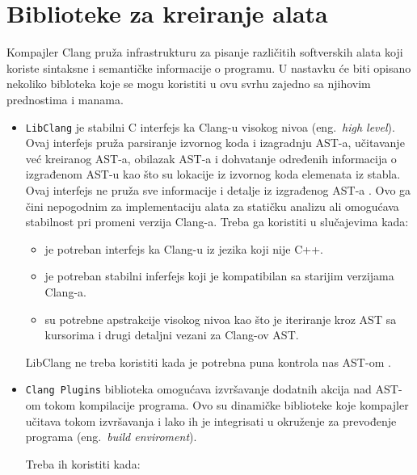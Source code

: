 \documentclass[12pt,oneside]{memoir}
\begin{document}
\section{Biblioteke za kreiranje alata}

 Kompajler Clang pru\v{z}a infrastrukturu za pisanje razli\v{c}itih softverskih alata koji koriste sintaksne i semanti\v{c}ke informacije o programu. U nastavku \'{c}e biti opisano nekoliko bibloteka koje se mogu koristiti u ovu svrhu zajedno sa njihovim prednostima i manama.


\begin{itemize}
\item \texttt{LibClang} je stabilni C interfejs ka Clang-u visokog nivoa (eng.~\textit{high level}). Ovaj interfejs pru\v{z}a parsiranje izvornog koda
i izagradnju AST-a, u\v{c}itavanje ve\'{c} kreiranog AST-a, obilazak AST-a i dohvatanje određenih informacija o izgrađenom AST-u kao \v{s}to su lokacije iz izvornog koda elemenata iz stabla. Ovaj interfejs ne pru\v{z}a sve informacije i detalje iz izgrađenog AST-a \cite{LibClang}. Ovo ga \v{c}ini nepogodnim za implementaciju alata za stati\v{c}ku analizu ali omogu\'{c}ava stabilnost pri promeni verzija Clang-a.
Treba ga koristiti u slu\v{c}ajevima kada:
\begin{itemize}
  \item je potreban interfejs ka Clang-u iz jezika koji nije C++.
  \item je potreban stabilni inferfejs koji je kompatibilan sa starijim verzijama Clang-a.
  \item su potrebne apstrakcije visokog nivoa kao \v{s}to je iteriranje kroz AST sa kursorima i drugi detaljni vezani za Clang-ov AST.
\end{itemize}
LibClang ne treba koristiti kada je potrebna puna kontrola nas AST-om \cite{RightInterface}.

\item \texttt{Clang Plugins} biblioteka omogu\'{c}ava izvr\v{s}avanje dodatnih akcija nad AST-om tokom kompilacije programa. Ovo su dinami\v{c}ke biblioteke koje kompajler u\v{c}itava tokom izvr\v{s}avanja i lako ih je integrisati u okru\v{z}enje za prevođenje programa (eng.~\textit{build enviroment}).

Treba ih koristiti kada:


\end{itemize}
\end{document}
